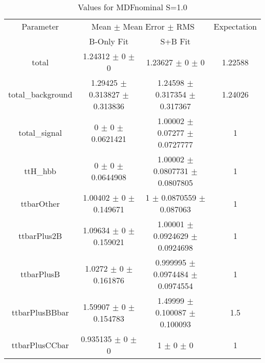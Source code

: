 \begin{table}
\centering
\caption{Values for MDFnominal S=1.0}
\begin{tabular}{cccc}
\toprule
Parameter & \multicolumn{2}{c}{Mean $\pm$ Mean Error $\pm$ RMS} & Expectation\\
 & B-Only Fit & S+B Fit & \\
\midrule
total & \num{1.24312} $\pm$ \num{0} $\pm$ \num{0} & \num{1.23627} $\pm$ \num{0} $\pm$ \num{0} & \num{1.22588}\\
total\_background & \num{1.29425} $\pm$ \num{0.313827} $\pm$ \num{0.313836} & \num{1.24598} $\pm$ \num{0.317354} $\pm$ \num{0.317367} & \num{1.24026}\\
total\_signal & \num{0} $\pm$ \num{0} $\pm$ \num{0.0621421} & \num{1.00002} $\pm$ \num{0.07277} $\pm$ \num{0.0727777} & \num{1}\\
ttH\_hbb & \num{0} $\pm$ \num{0} $\pm$ \num{0.0644908} & \num{1.00002} $\pm$ \num{0.0807731} $\pm$ \num{0.0807805} & \num{1}\\
ttbarOther & \num{1.00402} $\pm$ \num{0} $\pm$ \num{0.149671} & \num{1} $\pm$ \num{0.0870559} $\pm$ \num{0.087063} & \num{1}\\
ttbarPlus2B & \num{1.09634} $\pm$ \num{0} $\pm$ \num{0.159021} & \num{1.00001} $\pm$ \num{0.0924629} $\pm$ \num{0.0924698} & \num{1}\\
ttbarPlusB & \num{1.0272} $\pm$ \num{0} $\pm$ \num{0.161876} & \num{0.999995} $\pm$ \num{0.0974484} $\pm$ \num{0.0974554} & \num{1}\\
ttbarPlusBBbar & \num{1.59907} $\pm$ \num{0} $\pm$ \num{0.154783} & \num{1.49999} $\pm$ \num{0.100087} $\pm$ \num{0.100093} & \num{1.5}\\
ttbarPlusCCbar & \num{0.935135} $\pm$ \num{0} $\pm$ \num{0} & \num{1} $\pm$ \num{0} $\pm$ \num{0} & \num{1}\\
\bottomrule
\end{tabular}
\end{table}